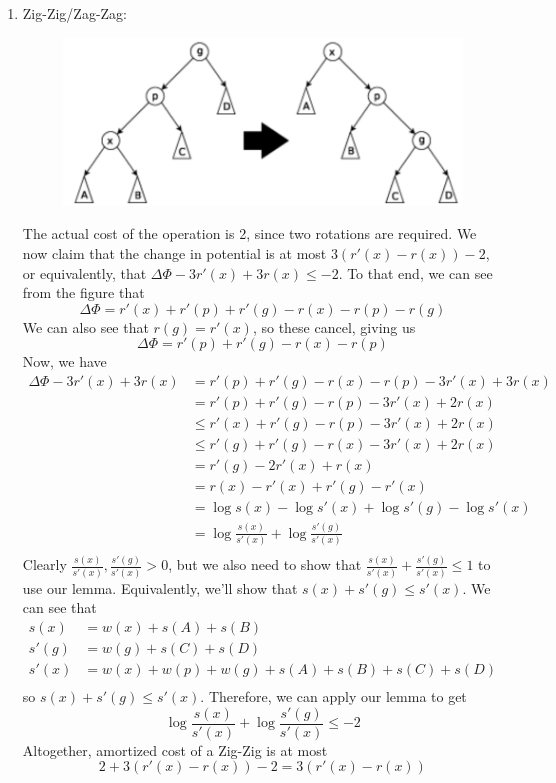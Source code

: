\documentclass[12pt]{article}
\begin{document}
\begin{enumerate}
  \item Zig-Zig/Zag-Zag:
  \begin{figure}[!ht]
    \centering
    \includegraphics[scale=0.33]{pics/splay_tree/zig_zig2}
  \end{figure}
  The actual cost of the operation is 2, since two rotations are required. We now claim that the change in potential is at most $3(r'(x) - r(x)) - 2$, or equivalently, that $\Delta\Phi -3r'(x) + 3r(x) \leq -2$. To that end, we can see from the figure that
  \[ \Delta\Phi = r'(x) + r'(p)+ r'(g) - r(x) - r(p) - r(g) \]
  We can also see that $r(g) = r'(x)$, so these cancel, giving us
  \[ \Delta\Phi = r'(p)+ r'(g) - r(x) - r(p) \]
  Now, we have
  \begin{align*}
    \Delta\Phi -3r'(x) + 3r(x) &= r'(p) + r'(g) - r(x) - r(p) -3r'(x) + 3r(x) \\
    &= r'(p) + r'(g) - r(p) - 3r'(x) + 2r(x)\\
    &\leq r'(x) + r'(g) - r(p) - 3r'(x) + 2r(x)\\
    &\leq r'(g) + r'(g) - r(x) - 3r'(x) + 2r(x)\\
    &= r'(g) - 2r'(x) + r(x)\\
    &= r(x) - r'(x) + r'(g) - r'(x)\\
    &= \log s(x) - \log s'(x) + \log s'(g) - \log s'(x)\\
    &= \log \frac{s(x)}{s'(x)} + \log \frac{s'(g)}{s'(x)} \\
  \end{align*}
  Clearly $\frac{s(x)}{s'(x)}, \frac{s'(g)}{s'(x)} > 0$, but we also need to show that $\frac{s(x)}{s'(x)} + \frac{s'(g)}{s'(x)} \leq 1$ to use our lemma. Equivalently, we'll show that $s(x) + s'(g) \leq s'(x)$. We can see that
  \begin{align*}
    s(x) &= w(x) + s(A) + s(B) \\
    s'(g) &= w(g) + s(C) + s(D) \\
    s'(x) &= w(x) + w(p) + w(g) + s(A) + s(B) + s(C) + s(D) \\
  \end{align*}
  so $s(x) + s'(g) \leq s'(x)$. Therefore, we can apply our lemma to get
  \[ \log \frac{s(x)}{s'(x)} + \log \frac{s'(g)}{s'(x)} \leq -2 \]
  Altogether, amortized cost of a Zig-Zig is at most
  \[ 2 + 3(r'(x) - r(x)) - 2 = 3(r'(x) - r(x)) \]


\end{enumerate}
\end{document}
